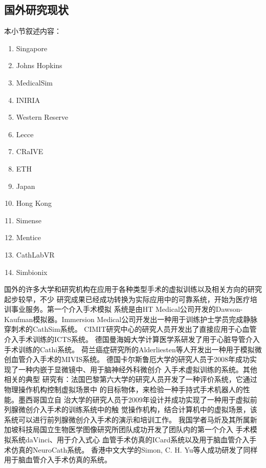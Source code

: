 \subsection{国外研究现状}

本小节叙述内容：
\begin{enumerate}
  \item Singapore
  \item Johns Hopkins
  \item MedicalSim
  \item INIRIA
  \item Western Reserve
  \item Lecce
  \item CRaIVE
  \item ETH
  \item Japan
  \item Hong Kong
  \item Simense
  \item Mentice
  \item CathLabVR
  \item Simbionix
\end{enumerate}

国外的许多大学和研究机构在应用于各种类型手术的虚拟训练以及相关方向的研究起步较早，不少
研究成果已经成功转换为实际应用中的可靠系统，开始为医疗培训事业服务。第一个介入手术模拟
系统是由HT Medical公司开发的Dawson-Kaufman模拟器\cite{meglan1996making}。Immersion 
Medical公司开发出一种用于训练护士学员完成静脉穿刺术的CathSim系统\cite{ursino1999cathsim}。
CIMIT研究中心的研究人员开发出了直接应用于心血管介入手术训练的ICTS系统\cite{cotin2000icts}。
德国曼海姆大学计算医学系研发了用于心脏导管介入手术训练的Cathi系统\cite{hofer2002cathi}。
荷兰癌症研究所的Alderliesten等人开发出一种用于模拟微创血管介入手术的MIVIS系统\cite{alderliesten2004simulation}。
德国卡尔斯鲁厄大学的研究人员于2008年成功实现了一种内嵌于显微镜中、用于脑神经外科微创介
入手术虚拟训练的系统\cite{mauro2008development}\cite{mauro2009virtual}。其他相关的典型
研究有：法国巴黎第六大学的研究人员开发了一种评价系统，它通过物理操作机构控制虚拟场景中
的目标物体，来检验一种手持式手术机器人的性能\cite{zahraee2009evaluating}。墨西哥国立自
治大学的研究人员于2009年设计并成功实现了一种用于虚拟前列腺微创介入手术的训练系统中的触
觉操作机构，结合计算机中的虚拟场景，该系统可以进行前列腺微创介入手术的演示和培训工作\cite{padilla2009virtual}。
我国学者马炘及其所属新加坡科技局国立生物医学图像研究所团队成功开发了团队内的第一个介入
手术模拟系统daVinci\cite{wang1996potential}\cite{chui1996potential}、用于介入式心
血管手术仿真的ICard系统\cite{wang1999realtime}\cite{chui1998icard}以及用于脑血管介入手
术仿真的NeuroCath系统\cite{anderson2001pc}\cite{chui2002training}\cite{ma2004computer}\cite{ma2006customable}。
香港中文大学的Simon, C. H. Yu等人成功研发了同样用于脑血管介入手术仿真的系统\cite{cuhkweb}。

